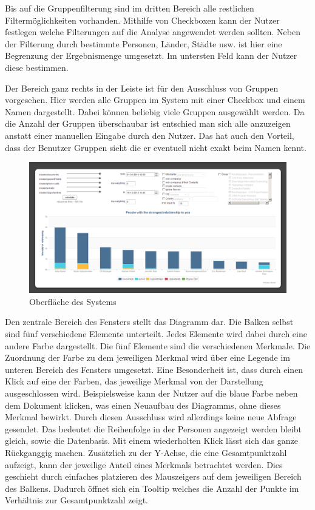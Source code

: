 Bis auf die Gruppenfilterung sind im dritten Bereich alle restlichen Filtermöglichkeiten vorhanden. Mithilfe von Checkboxen kann der Nutzer festlegen welche Filterungen auf die Analyse angewendet werden sollten. Neben der Filterung durch bestimmte Personen, Länder, Städte usw. ist hier eine Begrenzung der Ergebnismenge umgesetzt. Im untersten Feld kann der Nutzer diese bestimmen.

Der Bereich ganz rechts in der Leiste ist für den Ausschluss von Gruppen vorgesehen. Hier werden alle Gruppen im System mit einer Checkbox und einem Namen dargestellt. Dabei können beliebig viele Gruppen ausgewählt werden. Da die Anzahl der Gruppen überschaubar ist entschied man sich alle anzuzeigen anstatt einer manuellen Eingabe durch den Nutzer. Das hat auch den Vorteil, dass der Benutzer Gruppen sieht die er eventuell nicht exakt beim Namen kennt.     

\begin{figure}[htbp]
\centering
\includegraphics[width=\textwidth]{pics/final_screen.png}
\caption{Oberfläche des Systems}
\label{ergebniss_oberflaeche_haupt}
\end{figure}

Den zentrale Bereich des Fensters stellt das Diagramm dar. Die Balken selbst sind fünf verschiedene Elemente unterteilt. Jedes Elemente wird dabei durch eine andere Farbe dargestellt. Die fünf Elemente sind die verschiedenen Merkmale. Die Zuordnung der Farbe zu dem jeweiligen Merkmal wird über eine Legende im unteren Bereich des Fensters umgesetzt. Eine Besonderheit ist, dass durch einen Klick auf eine der Farben, das jeweilige Merkmal von der Darstellung ausgeschlossen wird. Beispielsweise kann der Nutzer auf die blaue Farbe neben dem Dokument klicken, was einen Neuaufbau des Diagramms, ohne dieses Merkmal bewirkt. Durch diesen Ausschluss wird allerdings keine neue Abfrage gesendet. Das  bedeutet die Reihenfolge in der Personen angezeigt werden bleibt gleich, sowie die Datenbasis. Mit einem wiederholten Klick lässt sich das ganze Rückganggig machen. Zusätzlich zu der Y-Achse, die eine Gesamtpunktzahl aufzeigt, kann der jeweilige Anteil eines Merkmals betrachtet werden. Dies geschieht durch einfaches platzieren des Mauszeigers auf dem jeweiligen Bereich des Balkens. Dadurch öffnet sich ein Tooltip welches die Anzahl der Punkte im Verhältnis zur Gesamtpunktzahl zeigt.

